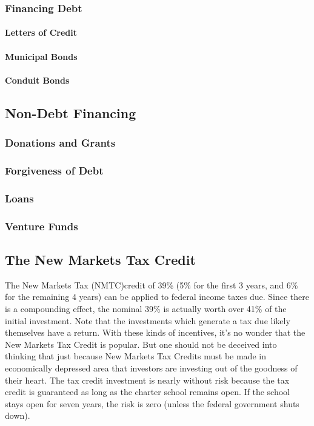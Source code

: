 \subsubsection{Financing Debt}\indent%
\label{sec:financing_debt}

\paragraph{Letters of Credit}
\paragraph{Municipal Bonds}
\paragraph{Conduit Bonds}

\subsection{Non-Debt Financing}\indent%
\label{sec:non_debt_financing}

\subsubsection{Donations and Grants}\indent%
\label{sec:donations_grants}

\subsubsection{Forgiveness of Debt}\indent%
\label{sec:forgiveness_debt}

\subsubsection{Loans}\indent%
\label{sec:loans}

\subsubsection{Venture Funds}\indent%
\label{sec:venture_funds}

\subsection{The New Markets Tax Credit}\indent%
\label{sec:NMTC}

The New Markets Tax (NMTC)credit of 39\% (5\% for the first 3 years, and 6\% for the remaining 4 years) can be applied to federal income taxes due. Since there is a compounding effect, the nominal 39\% is actually worth over 41\% of the initial investment. Note that the investments which generate a tax due likely themselves have a return. With these kinds of incentives, it's no wonder that the New Markets Tax Credit is popular. But one should not be deceived into thinking that just because New Markets Tax Credits must be made in economically depressed area that investors are investing out of the goodness of their heart. The tax credit investment is nearly without risk because the tax credit is guaranteed as long as the charter school remains open. If the school stays open for seven years, the risk is zero (unless the federal government shuts down).

